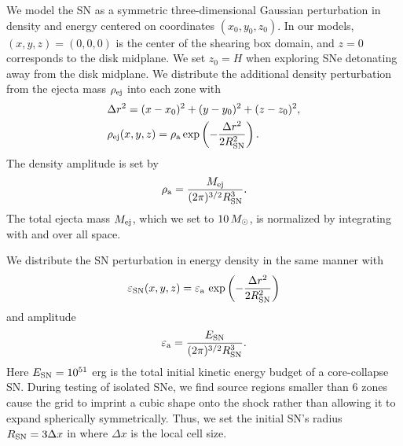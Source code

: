 
We model the SN as a symmetric three-dimensional Gaussian perturbation in density and energy centered on coordinates $(x_0, y_0, z_0)$.
In our models, $(x, y, z) = (0, 0, 0)$ is the center of the shearing box domain, and $z=0$ corresponds to the disk midplane.
We set $z_0=H$ when exploring SNe detonating away from the disk midplane.
We distribute the additional density perturbation from the ejecta mass $\rho_{\rm ej}$ into each zone with
\begin{eqnarray}
    &\Delta r^2 = (x-x_0)^2 + (y-y_0)^2 + (z-z_0)^2, \label{eqn:sn-radius}\\
    &\rho_{\rm ej} (x, y, z) = \rho_{\rm a}\,  {\rm exp}\left(-\frac{\Delta r^2}{2 R_{\rm SN}^2}\right). \label{eqn:ejecta-gauss}
\end{eqnarray}
The density amplitude is set by
\begin{equation} \label{eqn:ejecta-amplitude}
    \rho_{\rm a} = \frac{M_{\rm ej}}{(2 \pi)^{3/2} R_{\rm SN}^3}. 
\end{equation}
The total ejecta mass $M_{\rm ej}$, which we set to $10\,M_{\odot}$, is normalized by integrating  with  and  over all space.

We distribute the SN perturbation in energy density in the same manner with
\begin{equation} \label{eqn:energy-gauss}
    \varepsilon_{\rm SN} (x, y, z) = \varepsilon_{\rm a}\, \exp\left(-\frac{\Delta r^2}{2 R_{\rm SN}^2}\right)
\end{equation}
and amplitude
\begin{equation} \label{eqn:energy-amplitude}
    \varepsilon_{\rm a} = \frac{ E_{\rm SN} }{ (2 \pi)^{3/2} R_{\rm SN}^3 }. 
\end{equation}
Here $E_{\rm SN} = 10^{51}$ erg is the total initial kinetic energy budget of a core-collapse SN.
During testing of isolated SNe, we find source regions smaller than 6 zones cause the grid to imprint a cubic shape onto the shock rather than allowing it to expand spherically symmetrically.
Thus, we set the initial SN's radius $R_{\rm SN} = 3\Delta x$ in  where $\Delta x$ is the local cell size.

